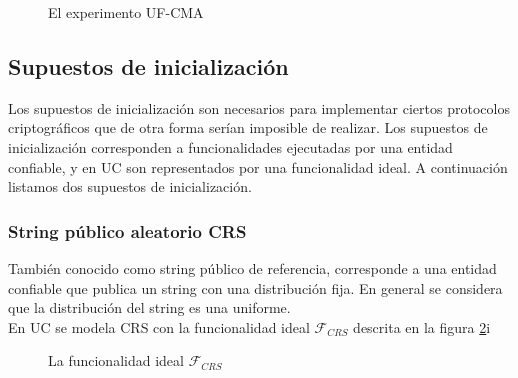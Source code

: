 \begin{figure}
\caption{El experimento UF-CMA}
\label{fig:uf-cma}
\end{figure}

\subsection{Supuestos de inicialización}
Los supuestos de inicialización son necesarios para implementar ciertos protocolos criptográficos
que de otra forma serían imposible de realizar. Los supuestos de inicialización corresponden a funcionalidades
ejecutadas por una entidad confiable, y en UC son representados por una funcionalidad ideal. A continuación
listamos dos supuestos de inicialización.


\subsubsection{String público aleatorio CRS}
También conocido como string público de referencia, corresponde a una entidad confiable que publica un string
con una distribución fija. En general se considera que la distribución del string es una uniforme.\\
En UC se modela CRS con la funcionalidad ideal $\mathcal{F}_{CRS}$ descrita en la figura \ref{fig:crs}i

\begin{figure}
\caption{La funcionalidad ideal $\mathcal{F}_{CRS}$}
\label{fig:crs}
\end{figure}


